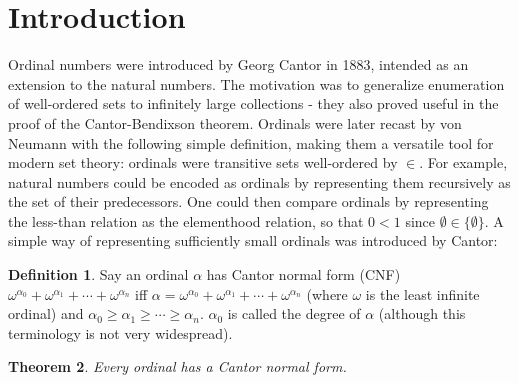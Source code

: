 \documentclass{article}
\title{\rfont \mytitle}
\author{\authorfont \myauthor}
\date{\rfont \today}
\theoremstyle{definition}
\newtheorem{definition}{Definition}[section]
\theoremstyle{plain}
\newtheorem{theorem}[definition]{Theorem}
\theoremstyle{plain}
\theoremstyle{plain}
\theoremstyle{plain}
\theoremstyle{remark}
\theoremstyle{remark}
\theoremstyle{remark}
\theoremstyle{plain}
\theoremstyle{plain}
\begin{document}
\maketitle

\begin{abstract}
This paper serves to define an extension, which we call \textit{dimensional Veblen}, of Oswald Veblen's system of ordinal functions below the large Veblen ordinal. This is facilitated by iterating derivatives of ordinal functions along multidimensional array structures, and can be viewed as the ``maximal" natural extension of the Veblen functions. We then construct an ordinal notation based on it, and provide conversion algorithms to and from Buchholz's function.
\end{abstract}

\section{Introduction}
Ordinal numbers were introduced by Georg Cantor in 1883, intended as an extension to the natural numbers. The motivation was to generalize enumeration of well-ordered sets to infinitely large collections - they also proved useful in the proof of the Cantor-Bendixson theorem. Ordinals were later recast by von Neumann with the following simple definition, making them a versatile tool for modern set theory: ordinals were transitive sets well-ordered by $\in$. For example, natural numbers could be encoded as ordinals by representing them recursively as the set of their predecessors. One could then compare ordinals by representing the less-than relation as the elementhood relation, so that $0 < 1$ since $\emptyset \in \{\emptyset\}$. A simple way of representing sufficiently small ordinals was introduced by Cantor:

\begin{definition}
Say an ordinal $\alpha$ has Cantor normal form (CNF) $\omega^{\alpha_0} + \omega^{\alpha_1} + \cdots + \omega^{\alpha_n}$ iff $\alpha = \omega^{\alpha_0} + \omega^{\alpha_1} + \cdots + \omega^{\alpha_n}$ (where $\omega$ is the least infinite ordinal) and $\alpha_0 \geq \alpha_1 \geq \cdots \geq \alpha_n$. $\alpha_0$ is called the degree of $\alpha$ (although this terminology is not very widespread).
\end{definition}

\begin{theorem}
Every ordinal has a Cantor normal form.
\end{theorem}
\end{document}
